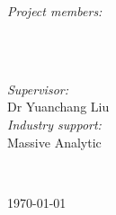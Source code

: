 \begin{titlepage}
  \begin{minipage}{0.4\textwidth}
    \begin{flushleft} \large
      \emph{Project members:}\\
      \@author %
      \\[1.2em]
    \end{flushleft}
  \end{minipage}
  ~
  \begin{minipage}{0.4\textwidth}
    \begin{flushright} \large
      \emph{Supervisor:} \\
      Dr Yuanchang Liu \\[1.2em] %
      \emph{Industry support:} \\
      Massive Analytic %
    \end{flushright}
  \end{minipage}\\[2cm]
  \makeatother



  {\large \today}\\[2cm] %

  \vfill %

\end{titlepage}
